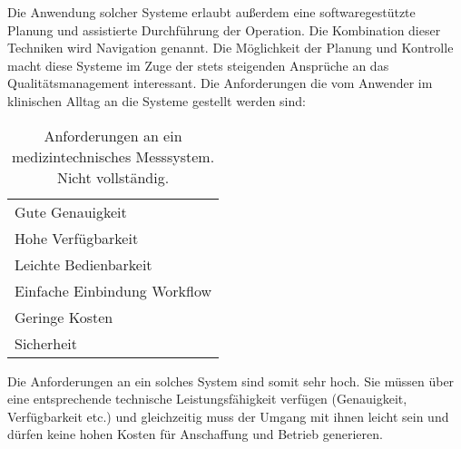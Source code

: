 Die Anwendung solcher Systeme erlaubt außerdem eine softwaregestützte Planung und assistierte Durchführung der Operation. Die Kombination dieser Techniken wird Navigation genannt. Die Möglichkeit der Planung und Kontrolle macht diese Systeme im Zuge der stets steigenden Ansprüche an das Qualitätsmanagement interessant. Die Anforderungen die vom Anwender im klinischen Alltag an die Systeme gestellt werden sind:
%
\begin{table} [H]
	\begin{center}
		\begin{tabular}{l}
		Gute Genauigkeit\\
		Hohe Verfügbarkeit\\
		Leichte Bedienbarkeit\\
		Einfache Einbindung Workflow\\
		Geringe Kosten\\
		Sicherheit\\
		\end{tabular}
	\end{center}
	\caption[Anforderungen Trackingsysteme]{Anforderungen an ein medizintechnisches Messsystem. Nicht vollständig.}
	\label{tab:requirements_system}
\end{table}
%
Die Anforderungen an ein solches System sind somit sehr hoch. Sie müssen über eine entsprechende technische Leistungsfähigkeit verfügen (Genauigkeit, Verfügbarkeit etc.) und gleichzeitig muss der Umgang mit ihnen leicht sein und dürfen keine hohen Kosten für Anschaffung und Betrieb generieren.\\
%
